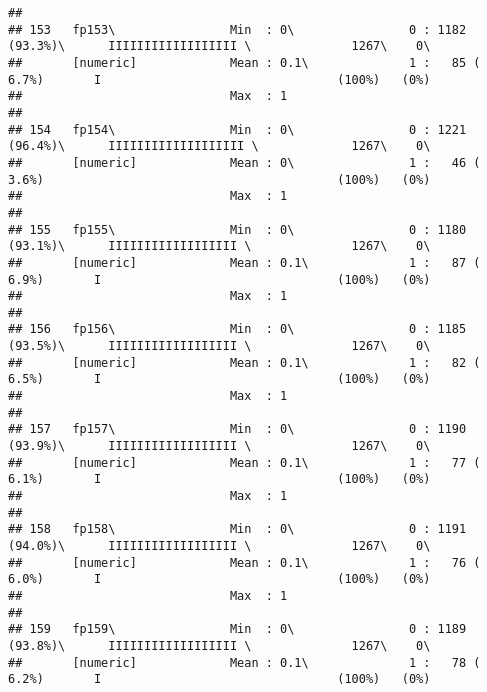 \documentclass[]{article}
\begin{document}
\begin{verbatim}
## 
## 153   fp153\                Min  : 0\                0 : 1182 (93.3%)\      IIIIIIIIIIIIIIIIII \              1267\    0\       
##       [numeric]             Mean : 0.1\              1 :   85 ( 6.7%)       I                                 (100%)   (0%)     
##                             Max  : 1                                                                                            
## 
## 154   fp154\                Min  : 0\                0 : 1221 (96.4%)\      IIIIIIIIIIIIIIIIIII \             1267\    0\       
##       [numeric]             Mean : 0\                1 :   46 ( 3.6%)                                         (100%)   (0%)     
##                             Max  : 1                                                                                            
## 
## 155   fp155\                Min  : 0\                0 : 1180 (93.1%)\      IIIIIIIIIIIIIIIIII \              1267\    0\       
##       [numeric]             Mean : 0.1\              1 :   87 ( 6.9%)       I                                 (100%)   (0%)     
##                             Max  : 1                                                                                            
## 
## 156   fp156\                Min  : 0\                0 : 1185 (93.5%)\      IIIIIIIIIIIIIIIIII \              1267\    0\       
##       [numeric]             Mean : 0.1\              1 :   82 ( 6.5%)       I                                 (100%)   (0%)     
##                             Max  : 1                                                                                            
## 
## 157   fp157\                Min  : 0\                0 : 1190 (93.9%)\      IIIIIIIIIIIIIIIIII \              1267\    0\       
##       [numeric]             Mean : 0.1\              1 :   77 ( 6.1%)       I                                 (100%)   (0%)     
##                             Max  : 1                                                                                            
## 
## 158   fp158\                Min  : 0\                0 : 1191 (94.0%)\      IIIIIIIIIIIIIIIIII \              1267\    0\       
##       [numeric]             Mean : 0.1\              1 :   76 ( 6.0%)       I                                 (100%)   (0%)     
##                             Max  : 1                                                                                            
## 
## 159   fp159\                Min  : 0\                0 : 1189 (93.8%)\      IIIIIIIIIIIIIIIIII \              1267\    0\       
##       [numeric]             Mean : 0.1\              1 :   78 ( 6.2%)       I                                 (100%)   (0%)     

\end{verbatim}
\end{document}
